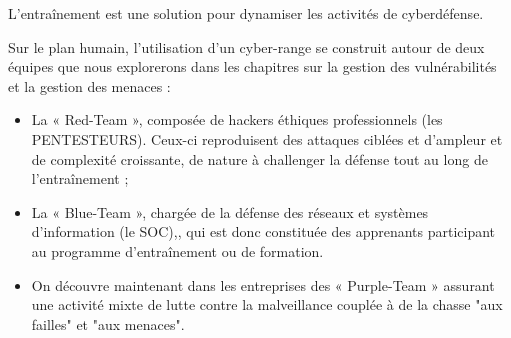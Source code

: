 L'entraînement est une solution pour dynamiser les activités de cyberdéfense.





Sur le plan humain,  l'utilisation d'un cyber-range se construit autour de deux équipes que nous explorerons dans les chapitres sur la gestion des vulnérabilités et la gestion des menaces :

\begin{itemize}
  \item La « Red-Team », composée de hackers éthiques professionnels (les PENTESTEURS). Ceux-ci reproduisent des attaques ciblées et d’ampleur et de complexité croissante, de nature à challenger la défense tout au long de l’entraînement ;
  \item  La « Blue-Team », chargée de la défense des réseaux et systèmes d’information (le SOC),, qui est donc constituée des apprenants participant au programme d’entraînement ou de formation.
  \item On découvre maintenant dans les entreprises des « Purple-Team » assurant une activité mixte de lutte contre la malveillance couplée à de la chasse "aux failles" et "aux menaces". 
\end{itemize}






